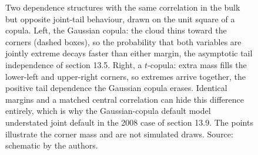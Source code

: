 \begin{figure}[htbp]
\begin{tikzpicture}[x=1cm, y=1cm, font=\small]
\end{tikzpicture}
\caption[Copula tail dependence]{Two dependence structures with the
same correlation in the bulk but opposite joint-tail behaviour, drawn
on the unit square of a copula. Left, the Gaussian copula: the cloud
thins toward the corners (dashed boxes), so the probability that both
variables are jointly extreme decays faster than either margin, the
asymptotic tail independence of section 13.5. Right, a $t$-copula:
extra mass fills the lower-left and upper-right corners, so extremes
arrive together, the positive tail dependence the Gaussian copula
erases. Identical margins and a matched central correlation can hide
this difference entirely, which is why the Gaussian-copula default
model understated joint default in the 2008 case of section 13.9. The
points illustrate the corner mass and are not simulated draws. Source:
schematic by the authors.}
\label{fig:vol02ch13:copula-tails}
\end{figure}

